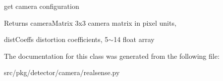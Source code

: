 get camera configuration 

\begin{DoxyReturn}{Returns}
camera\+Matrix 3x3 camera matrix in pixel units, 

dist\+Coeffs distortion coefficients, 5$\sim$14 float array 
\end{DoxyReturn}


The documentation for this class was generated from the following file\+:\begin{DoxyCompactItemize}
\item 
src/pkg/detector/camera/realsense.\+py\end{DoxyCompactItemize}
